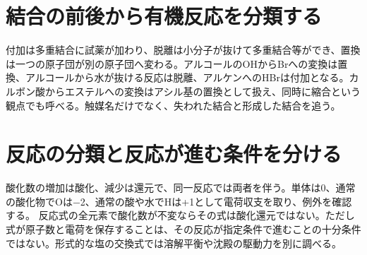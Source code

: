 \section{結合の前後から有機反応を分類する}
\label{theory:basicchem:organic}
付加は多重結合に試薬が加わり、脱離は小分子が抜けて多重結合等ができ、置換は一つの原子団が別の原子団へ変わる\autocite{chem55_organic}。アルコールのOHからBrへの変換は置換、アルコールから水が抜ける反応は脱離、アルケンへのHBrは付加となる。カルボン酸からエステルへの変換はアシル基の置換として扱え、同時に縮合という観点でも呼べる。触媒名だけでなく、失われた結合と形成した結合を追う。

\section{反応の分類と反応が進む条件を分ける}
\label{theory:basicchem:redox}
酸化数の増加は酸化、減少は還元で、同一反応では両者を伴う。単体は0、通常の酸化物でOは−2、通常の酸や水でHは+1として電荷収支を取り、例外を確認する\autocite{iupac_oxidation_state}。
反応式の全元素で酸化数が不変ならその式は酸化還元ではない。ただし式が原子数と電荷を保存することは、その反応が指定条件で進むことの十分条件ではない。形式的な塩の交換式では溶解平衡や沈殿の駆動力を別に調べる。

